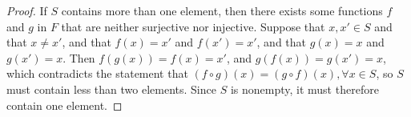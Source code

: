 \begin{proof}
	If $S$ contains more than one element, then there exists some functions $f$ and $g$ in $F$ that are neither surjective nor injective. Suppose that $x,x'\in S$ and that $x\neq x'$, and that $f(x)=x'$ and $f(x')=x'$, and that $g(x)=x$ and $g(x')=x$. Then $f(g(x))=f(x)=x'$, and $g(f(x))=g(x')=x$, which contradicts the statement that $(f\circ g)(x)=(g\circ f)(x), \forall x\in S$, so $S$ must contain less than two elements. Since $S$ is nonempty, it must therefore contain one element.
\end{proof}
















































































